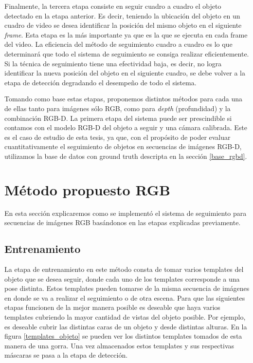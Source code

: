 Finalmente, la tercera etapa consiste en seguir cuadro a cuadro el objeto detectado en la etapa anterior. Es decir, teniendo la ubicación del objeto en un cuadro de video se desea identificar la posición del mismo objeto en el siguiente \textit{frame}. Esta etapa es la más importante ya que es la que se ejecuta en cada frame del video. La eficiencia del método de seguimiento cuadro a cuadro es lo que determinará que todo el sistema de seguimiento se consiga realizar eficientemente. Si la técnica de seguimiento tiene una efectividad baja, es decir, no logra identificar la nueva posición del objeto en el siguiente cuadro, se debe volver a la etapa de detección degradando el desempeño de todo el sistema.

Tomando como base estas etapas, proponemos distintos métodos para cada una de ellas tanto para imágenes sólo RGB, como para \textit{depth} (profundidad) y la combinación RGB-D. La primera etapa del sistema puede ser prescindible si contamos con el modelo RGB-D del objeto a seguir y una cámara calibrada. Este es el caso de estudio de esta tesis, ya que, con el propósito de poder evaluar cuantitativamente el seguimiento de objetos en secuencias de imágenes RGB-D, utilizamos la base de datos con ground truth descripta en la sección \ref{base_rgbd}.




\section{Método propuesto RGB}\label{metodo_rgb}
En esta sección explicaremos como se implementó el sistema de seguimiento para secuencias de imágenes RGB basándonos en las etapas explicadas previamente.

\subsection{Entrenamiento}
La etapa de entrenamiento en este método consta de tomar varios templates del objeto que se desea seguir, donde cada uno de los templates corresponde a una pose distinta. Estos templates pueden tomarse de la misma secuencia de imágenes en donde se va a realizar el seguimiento o de otra escena. Para que las siguientes etapas funcionen de la mejor manera posible es deseable que haya varios templates cubriendo la mayor cantidad de vistas del objeto posible. Por ejemplo, es deseable cubrir las distintas caras de un objeto y desde distintas alturas. En la figura \ref{templates_objeto} se pueden ver los distintos templates tomados de esta manera de una gorra. Una vez almacenados estos templates y sus respectivas máscaras se pasa a la etapa de detección.

